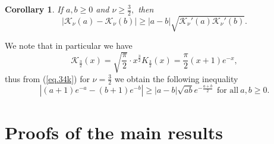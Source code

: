 \documentclass[10pt]{amsart}
\newtheorem{corollary}{Corollary}
\begin{document}
\begin{corollary}\label{th4k}
If $a,b\geq0$ and $\nu\geq\frac{3}{2},$ then
\begin{equation}\label{eq.34k}|\mathcal{K}_{\nu}(a)-\mathcal{K}_{\nu}(b)|\geq
|a-b|\sqrt{\mathcal{K}_{\nu}'(a)\mathcal{K}_{\nu}'(b)}.\end{equation}
\end{corollary}

We note that in particular we have
\begin{equation}\label{k3/2}\mathcal{K}_{\frac{3}{2}}(x)=\sqrt{\frac{\pi}{2}}\cdot
x^{\frac{3}{2}}K_{\frac{3}{2}}(x)=\frac{\pi}{2}(x+1)e^{-x},\end{equation} thus from (\ref{eq.34k}) for $\nu=\frac{3}{2}$ we obtain
the following inequality
$$\left|(a+1)e^{-a}-(b+1)e^{-b}\right|\geq |a-b|\sqrt{ab}e^{-\frac{a+b}{2}} \ \ \mbox{for all}\
a,b\geq 0.
$$

\section{\bf Proofs of the main results}
\setcounter{equation}{0}
\end{document}
